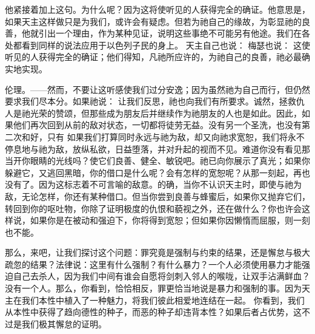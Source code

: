他紧接着加上这句。为什么呢？因为这将使听见的人获得完全的确证。他意思是，如果天主这样做只是为我们，或许会有疑虑。但若为祂自己的缘故，为彰显祂的良善，他就引出一个理由，作为某种见证，说明这些事绝不可能另有他途。我们在各处都看到同样的说法应用于以色列子民的身上。 天主自己也说： 梅瑟也说： 这使听见的人获得完全的确证；他们得知，凡祂所应许的，为祂自己的良善，祂必最确实地实现。\par

伦理。——然而，不要让这听感使我们过分安逸；因为虽然祂为自己而行，但仍然要求我们尽本分。如果祂说： 让我们反思，祂也向我们有所要求。诚然，拯救仇人是祂光荣的赞颂，但那些成为朋友后并继续作为祂朋友的人也是如此。因此，如果他们再次回到从前的敌对状态，一切都将徒劳无益。没有另一个圣洗，也没有第二次和好，只有 如果我们打算同时永远与祂为敌，却又向祂求宽恕，我们将永不停息地与祂为敌，放纵私欲，日益堕落，并对升起的视而不见。难道你没有看见那当开你眼睛的光线吗？使它们良善、健全、敏锐吧。祂已向你展示了真光；如果你躲避它，又逃回黑暗，你的借口是什么呢？会有怎样的宽恕呢？从那一刻起，再也没有了。因为这标志着不可言喻的敌意。的确，当你不认识天主时，即使与祂为敌，无论怎样，你还有某种借口。但当你尝到良善与蜂蜜后，如果你又抛弃它们，转回到你的呕吐物，你除了证明极度的仇恨和藐视之外，还在做什么？你也许会这样说，如果你是在被动和强迫下，你将得到宽恕；但如果你因懒惰而屈服，则一刻也不能。\par

那么，来吧，让我们探讨这个问题：罪究竟是强制与约束的结果，还是懈怠与极大疏忽的结果？法律说：这里有什么强制？有什么暴力？一个人必须使用暴力才能强迫自己去杀人，因为我们中间有谁会自愿将剑刺入邻人的喉咙，让双手沾满鲜血？没有一个人。那么，你看到，恰恰相反，罪更恰当地说是暴力和强制的事。因为天主在我们本性中植入了一种魅力，将我们彼此相爱地连结在一起。 你看到，我们从本性中获得了趋向德性的种子，而恶的种子却违背本性？如果后者占优势，这不过是我们极其懈怠的证明。\par

